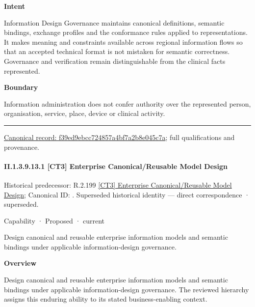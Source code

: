 \textbf{Intent}



Information Design Governance maintains canonical definitions, semantic bindings, exchange profiles and the conformance rules applied to representations. It makes meaning and constraints available across regional information flows so that an accepted technical format is not mistaken for semantic correctness. Governance and verification remain distinguishable from the clinical facts represented.



\textbf{Boundary}



Information administration does not confer authority over the represented person, organisation, service, place, device or clinical activity.



\medskip\hrule\medskip

{\footnotesize \href{../../../../continuum/strategy/capability/f39ed9ebcc724857a4bf7a2b8e045c7a.md}{Canonical record: f39ed9ebcc724857a4bf7a2b8e045c7a}; full qualifications and provenance.}\par
\paragraph*{II.1.3.9.13.1 [CT3] Enterprise Canonical/Reusable Model Design}
\label{navigation:II.1.3.9.13.1}

{\small Historical predecessor: R.2.199 \hyperref[element:dbc37445ad944a85a7c4f26f410967b2]{[CT3] Enterprise Canonical/Reusable Model Design}; Canonical ID: \texttt{}. Superseded historical identity — direct correspondence · superseded.}\par
\label{element:90e9cd401ddf4c7690c978d8dd131413}
{\small Capability · Proposed · current}\par

Design canonical and reusable enterprise information models and semantic bindings under applicable information-design governance.



\textbf{Overview}



Design canonical and reusable enterprise information models and semantic bindings under applicable information-design governance. The reviewed hierarchy assigns this enduring ability to its stated business-enabling context.



